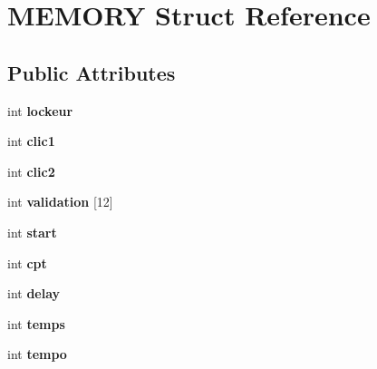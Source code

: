 \hypertarget{structMEMORY}{}\section{M\+E\+M\+O\+RY Struct Reference}
\label{structMEMORY}
\subsection*{Public Attributes}
\begin{DoxyCompactItemize}
\item 
int {\bfseries lockeur}\hypertarget{structMEMORY_afaf951f31958ae29b257a200d1097ae0}{}\label{structMEMORY_afaf951f31958ae29b257a200d1097ae0}

\item 
int {\bfseries clic1}\hypertarget{structMEMORY_aa6bcbbf0ed10325dfe7fce1e61e7c9ed}{}\label{structMEMORY_aa6bcbbf0ed10325dfe7fce1e61e7c9ed}

\item 
int {\bfseries clic2}\hypertarget{structMEMORY_a68f0f859c6ae5c991ec4e5f0b98d93e9}{}\label{structMEMORY_a68f0f859c6ae5c991ec4e5f0b98d93e9}

\item 
int {\bfseries validation} \mbox{[}12\mbox{]}\hypertarget{structMEMORY_ad6bce5091c086d15a76e7d0610a01507}{}\label{structMEMORY_ad6bce5091c086d15a76e7d0610a01507}

\item 
int {\bfseries start}\hypertarget{structMEMORY_a29f694b7714a58d55e9b7c06480c9b93}{}\label{structMEMORY_a29f694b7714a58d55e9b7c06480c9b93}

\item 
int {\bfseries cpt}\hypertarget{structMEMORY_a91c7367ce7eb09e409da16ec4d733313}{}\label{structMEMORY_a91c7367ce7eb09e409da16ec4d733313}

\item 
int {\bfseries delay}\hypertarget{structMEMORY_a9930314917a947ebc150ea3e96ab752a}{}\label{structMEMORY_a9930314917a947ebc150ea3e96ab752a}

\item 
int {\bfseries temps}\hypertarget{structMEMORY_a7d203f387ea4eb67c8102e8e87ff8fd1}{}\label{structMEMORY_a7d203f387ea4eb67c8102e8e87ff8fd1}

\item 
int {\bfseries tempo}\hypertarget{structMEMORY_a4f79ed479e9443011fb8aae0244fadd0}{}\label{structMEMORY_a4f79ed479e9443011fb8aae0244fadd0}


\end{DoxyCompactItemize}
